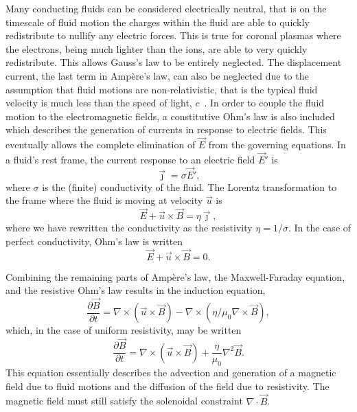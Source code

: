 Many conducting fluids can be considered electrically neutral, that is on the timescale of fluid motion the charges within the fluid are able to quickly redistribute to nullify any electric forces. This is true for coronal plasmas where the electrons, being much lighter than the ions, are able to very quickly redistribute. This allows Gauss's law to be entirely neglected. The displacement current, the last term in Ampère's law, can also be neglected due to the assumption that fluid motions are non-relativistic, that is the typical fluid velocity is much less than the speed of light, $c$~\cite{priestMagnetohydrodynamicsSuna}. In order to couple the fluid motion to the electromagnetic fields, a constitutive Ohm's law is also included which describes the generation of currents in response to electric fields. This eventually allows the complete elimination of $\vec{E}$ from the governing equations. In a fluid's rest frame, the current response to an electric field $\vec{E}'$ is
\begin{equation}
  \label{eq:rest_frame_ohms_law}
  \vec{\jmath} = \sigma \vec{E}',
\end{equation}
where $\sigma$ is the (finite) conductivity of the fluid. The Lorentz transformation to the frame where the fluid is moving at velocity $\vec{u}$ is
\begin{equation}
  \label{eq:resistive_ohms_law}
  {\vec {E}}+{\vec{u}}\times {\vec {B}}=\eta{\vec {\jmath}},
\end{equation}
where we have rewritten the conductivity as the resistivity $\eta = 1/\sigma$. In the case of perfect conductivity, Ohm's law is written
\begin{equation}
  \label{eq:ideal_ohms_law}
  {\vec {E}}+{\vec{u}}\times {\vec {B}}=0.
\end{equation}

Combining the remaining parts of Ampère's law, the Maxwell-Faraday equation, and the resistive Ohm's law results in the induction equation,
\begin{equation}
  \label{eq:nonsimple_induction_equation}
{\frac {\partial \vec {B} }{\partial t}} = \nabla \times (\vec{u} \times \vec{B}) - \nabla \times (\eta/\mu_0 \nabla \times \vec{B}),
\end{equation}
which, in the case of uniform resistivity, may be written
\begin{equation}
  \label{eq:induction_equation}
{\frac {\partial \vec {B} }{\partial t}} = \nabla \times (\vec{u} \times \vec{B}) + \frac{\eta}{\mu_0}\nabla^2 \vec{B}.
\end{equation}
This equation essentially describes the advection and generation of a magnetic field due to fluid motions and the diffusion of the field due to resistivity. The magnetic field must still satisfy the solenoidal constraint $\nabla \cdot \vec{B}$.

